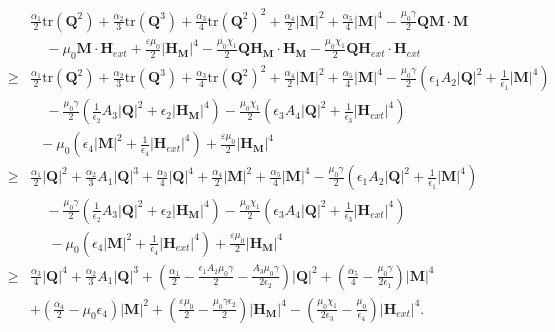 \documentclass{article}
\def\Qvec{\mathbf{Q}}
\def \Mvec{\mathbf{M}}
\def\Hvec{\mathbf{H}}
\begin{document}
\begin{eqnarray}
& &\frac{\alpha_1}{2}\mbox{tr}(\Qvec^2) + \frac{\alpha_2}{3}\mbox{tr}(\Qvec^3) + \frac{\alpha_3}{4}\mbox{tr}(\Qvec^2)^2 + \frac{\alpha_4}{2}|\Mvec|^2 + \frac{\alpha_5}{4}|\Mvec|^4 - \frac{\mu_0\gamma}{2}\Qvec\Mvec\cdot\Mvec\nonumber\\
& &~~~~~- \mu_0\Mvec\cdot \Hvec_{ext}+\frac{\varepsilon\mu_0}{2}|\Hvec_{\Mvec}|^4- \frac{\mu_0\chi_1}{2}\Qvec\Hvec_\Mvec\cdot\Hvec_\Mvec - \frac{\mu_0\chi_1}{2}\Qvec\Hvec_{ext}\cdot\Hvec_{ext}\nonumber\\
&\ge& \frac{\alpha_1}{2}\mbox{tr}(\Qvec^2) + \frac{\alpha_2}{3}\mbox{tr}(\Qvec^3) + \frac{\alpha_3}{4}\mbox{tr}(\Qvec^2)^2 + \frac{\alpha_4}{2}|\Mvec|^2 + \frac{\alpha_5}{4}|\Mvec|^4 - \frac{\mu_0\gamma}{2}\left(\epsilon_1A_2|\Qvec|^2+\frac{1}{\epsilon_1}|\Mvec|^4\right)\nonumber\\
& &~~~~~- \frac{\mu_0\gamma}{2}\left(\frac{1}{\epsilon_2}A_3|\Qvec|^2+\epsilon_2|\Hvec_\Mvec|^4\right) - \frac{\mu_0\chi_1}{2}\left(\epsilon_3A_4|\Qvec|^2+\frac{1}{\epsilon_3}|\Hvec_{ext}|^4\right)\nonumber\\
& &~~~-\mu_0\left(\epsilon_4|\Mvec|^2+\frac{1}{\epsilon_4}|\Hvec_{ext}|^4\right)+\frac{\varepsilon\mu_0}{2}|\Hvec_{\Mvec}|^4\nonumber\\
&\ge& \frac{\alpha_1}{2}|\Qvec|^2+\frac{\alpha_2}{3}A_1|\Qvec|^3+\frac{\alpha_3}{4}|\Qvec|^4 + \frac{\alpha_4}{2}|\Mvec|^2 + \frac{\alpha_5}{4}|\Mvec|^4 - \frac{\mu_0\gamma}{2}\left(\epsilon_1A_2|\Qvec|^2+\frac{1}{\epsilon_1}|\Mvec|^4\right)\nonumber\\
& &~~~~~- \frac{\mu_0\gamma}{2}\left(\frac{1}{\epsilon_2}A_3|\Qvec|^2+\epsilon_2|\Hvec_\Mvec|^4\right) - \frac{\mu_0\chi_1}{2}\left(\epsilon_3A_4|\Qvec|^2+\frac{1}{\epsilon_3}|\Hvec_{ext}|^4\right)\nonumber\\
& &~~~~~~-\mu_0\left(\epsilon_4|\Mvec|^2+\frac{1}{\epsilon_4}|\Hvec_{ext}|^4\right)+\frac{\varepsilon\mu_0}{2}|\Hvec_{\Mvec}|^4\nonumber\\ 
&\ge&\frac{\alpha_3}{4}|\Qvec|^4+\frac{\alpha_2}{3}A_1|\Qvec|^3+\left(\frac{\alpha_1}{2}-\frac{\epsilon_1A_2\mu_0\gamma}{2} - \frac{A_3\mu_0\gamma}{2\epsilon_2}\right)|\Qvec|^2+\left(\frac{\alpha_5}{4}-\frac{\mu_0\gamma}{2\epsilon_1}\right)|\Mvec|^4\nonumber\\
& &+\left(\frac{\alpha_4}{2}-\mu_0\epsilon_4\right)|\Mvec|^2+\left(\frac{\varepsilon\mu_0}{2}-\frac{\mu_0\gamma\epsilon_2}{2}\right)|\Hvec_{\Mvec}|^4-\left(\frac{\mu_0\chi_1}{2\epsilon_3}-\frac{\mu_0}{\epsilon_4} \right)|\Hvec_{ext}|^4.\label{lb:5}
\end{eqnarray}
\end{document}
